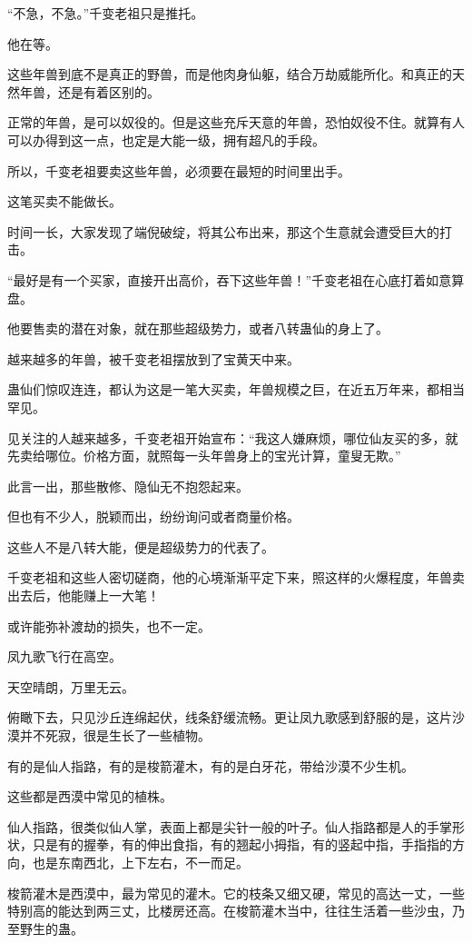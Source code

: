 \begin{this_body}
“不急，不急。”千变老祖只是推托。

他在等。

这些年兽到底不是真正的野兽，而是他肉身仙躯，结合万劫威能所化。和真正的天然年兽，还是有着区别的。

正常的年兽，是可以奴役的。但是这些充斥天意的年兽，恐怕奴役不住。就算有人可以办得到这一点，也定是大能一级，拥有超凡的手段。

所以，千变老祖要卖这些年兽，必须要在最短的时间里出手。

这笔买卖不能做长。

时间一长，大家发现了端倪破绽，将其公布出来，那这个生意就会遭受巨大的打击。

“最好是有一个买家，直接开出高价，吞下这些年兽！”千变老祖在心底打着如意算盘。

他要售卖的潜在对象，就在那些超级势力，或者八转蛊仙的身上了。

越来越多的年兽，被千变老祖摆放到了宝黄天中来。

蛊仙们惊叹连连，都认为这是一笔大买卖，年兽规模之巨，在近五万年来，都相当罕见。

见关注的人越来越多，千变老祖开始宣布：“我这人嫌麻烦，哪位仙友买的多，就先卖给哪位。价格方面，就照每一头年兽身上的宝光计算，童叟无欺。”

此言一出，那些散修、隐仙无不抱怨起来。

但也有不少人，脱颖而出，纷纷询问或者商量价格。

这些人不是八转大能，便是超级势力的代表了。

千变老祖和这些人密切磋商，他的心境渐渐平定下来，照这样的火爆程度，年兽卖出去后，他能赚上一大笔！

或许能弥补渡劫的损失，也不一定。

凤九歌飞行在高空。

天空晴朗，万里无云。

俯瞰下去，只见沙丘连绵起伏，线条舒缓流畅。更让凤九歌感到舒服的是，这片沙漠并不死寂，很是生长了一些植物。

有的是仙人指路，有的是梭箭灌木，有的是白牙花，带给沙漠不少生机。

这些都是西漠中常见的植株。

仙人指路，很类似仙人掌，表面上都是尖针一般的叶子。仙人指路都是人的手掌形状，只是有的握拳，有的伸出食指，有的翘起小拇指，有的竖起中指，手指指的方向，也是东南西北，上下左右，不一而足。

梭箭灌木是西漠中，最为常见的灌木。它的枝条又细又硬，常见的高达一丈，一些特别高的能达到两三丈，比楼房还高。在梭箭灌木当中，往往生活着一些沙虫，乃至野生的蛊。


\end{this_body}
